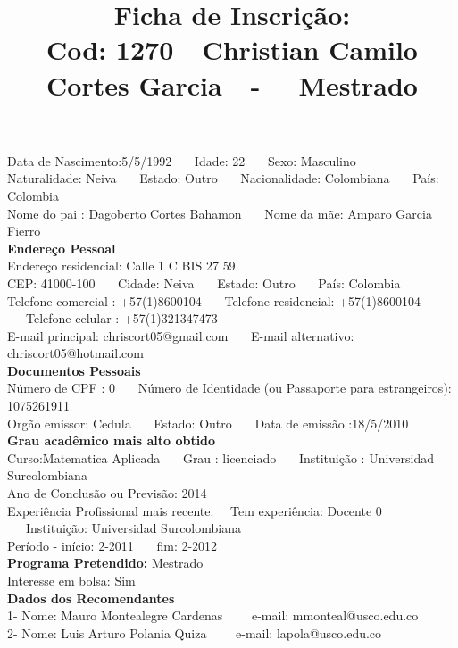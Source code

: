\documentclass[11pt]{article}
\title{\vspace*{-4cm} Ficha de Inscrição: \\Cod: 1270\ \ Christian Camilo Cortes Garcia\ \ - \ \ Mestrado 
 }
\date{}
\begin{document}
\maketitle
\vspace*{-1.5cm}
\noindent Data de Nascimento:5/5/1992
\ \ \ Idade: 22   \ \ \ Sexo: Masculino
\\
Naturalidade: Neiva  
\ \ \  Estado: Outro
\ \ \  Nacionalidade: Colombiana
\ \ \ País: Colombia
\\        
Nome do pai : Dagoberto Cortes Bahamon
\ \ \ Nome da mãe: Amparo Garcia Fierro          
\\[0.2cm]                     
\textbf{Endereço Pessoal} 
\\ 
\noindent Endereço residencial: Calle 1 C BIS 27 59
\\
        CEP: 41000-100 
\ \ \ Cidade: Neiva 
\ \ \ Estado: Outro 
\ \ \ País: Colombia
\\		
		Telefone comercial : +57(1)8600104
\ \ \ Telefone residencial: +57(1)8600104
\ \ \ Telefone celular : +57(1)321347473
\\
E-mail principal: chriscort05@gmail.com
\ \ \ E-mail alternativo: chriscort05@hotmail.com 
\\[0.2cm] 
\textbf{Documentos Pessoais}
\\
\noindent Número de CPF : 0
\ \ \ Número de Identidade (ou Passaporte para estrangeiros): 1075261911
\\
Orgão emissor: Cedula
\ \ \ Estado: Outro
\ \ \ Data de emissão :18/5/2010
\\[0.3cm]
\textbf{Grau acadêmico mais alto obtido}
\\	
Curso:Matematica Aplicada
\ \ \ Grau : licenciado
\ \ \ Instituição : Universidad Surcolombiana
\\			
Ano de Conclusão ou Previsão: 2014
\\ 
Experiência Profissional mais recente. \ \  
Tem experiência: Docente 0  
\ \ \ Instituição: Universidad Surcolombiana
\\  
Período - início: 2-2011
\ \ \ fim: 2-2012
\\[0.2cm] 
\textbf{Programa Pretendido:} Mestrado\\
Interesse em bolsa: Sim
\\[0.3cm]		
\textbf{Dados dos Recomendantes} 
\\
1- Nome: Mauro Montealegre Cardenas
\ \ \ \  e-mail: mmonteal@usco.edu.co 
\\
2- Nome: Luis Arturo Polania Quiza
\ \ \ \ e-mail: lapola@usco.edu.co
\\
\end{document}
